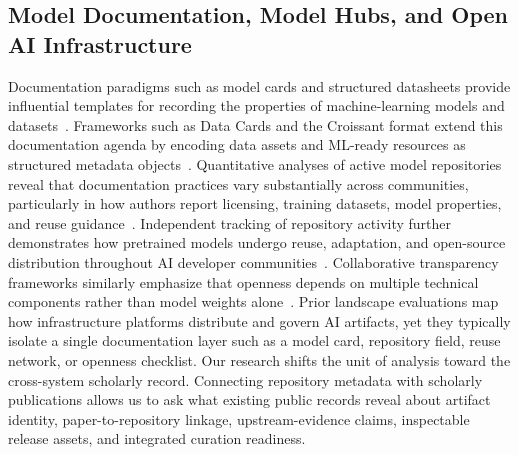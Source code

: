 \subsection{Model Documentation, Model Hubs, and Open AI Infrastructure}
Documentation paradigms such as model cards and structured datasheets provide influential templates for recording the properties of machine-learning models and datasets~\cite{mitchell2019modelcards,crisan2022interactive,shen2022modelcardtoolkit,gebru2021datasheets}.
Frameworks such as Data Cards and the Croissant format extend this documentation agenda by encoding data assets and ML-ready resources as structured metadata objects~\cite{pushkarna2022datacards,akhtar2024croissant}.
Quantitative analyses of active model repositories reveal that documentation practices vary substantially across communities, particularly in how authors report licensing, training datasets, model properties, and reuse guidance~\cite{liang2024modelcards,pepe2024hfdocs,kadasi2025modelhubs}.
Independent tracking of \hf repository activity further demonstrates how pretrained models undergo reuse, adaptation, and open-source distribution throughout AI developer communities~\cite{jiang2023ptmreuse,taraghi2024modelreuse,osborne2024aicommunity}.
Collaborative transparency frameworks similarly emphasize that openness depends on multiple technical components rather than model weights alone~\cite{bommasani2023fmi,white2024mof}.
Prior landscape evaluations map how infrastructure platforms distribute and govern AI artifacts, yet they typically isolate a single documentation layer such as a model card, repository field, reuse network, or openness checklist.
Our research shifts the unit of analysis toward the cross-system scholarly record.
Connecting repository metadata with scholarly publications allows us to ask what existing public records reveal about artifact identity, paper-to-repository linkage, upstream-evidence claims, inspectable release assets, and integrated curation readiness.
